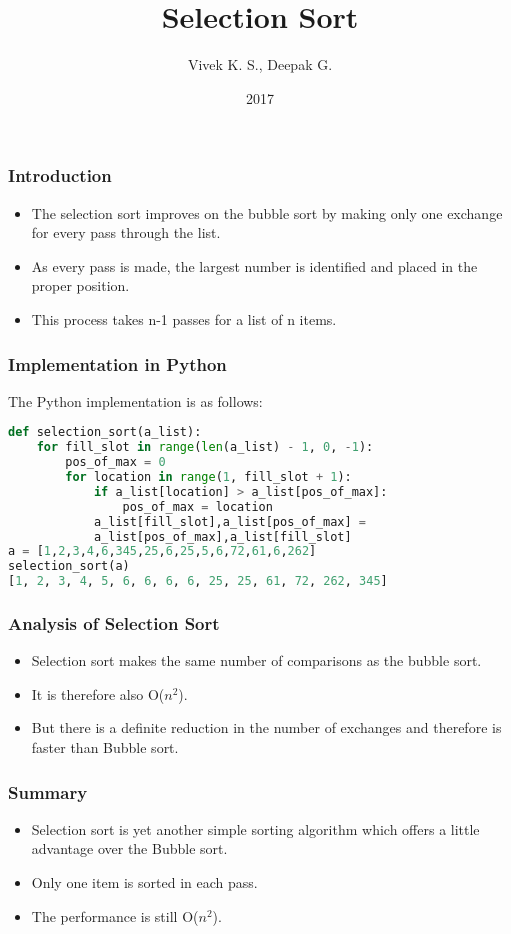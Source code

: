 \documentclass{beamer}
\title{Selection Sort}
\author{Vivek K. S., Deepak G.}
\institute{Information Systems Decision Sciences (ISDS)\\
MUMA College of Business\\
University of South Florida \\
Tampa, Florida}
\date{2017}
\begin{document}
\frame{\titlepage}
\begin{frame}
\frametitle{Introduction}
\begin{itemize}
\item The selection sort improves on the bubble sort by making only one exchange for every pass through the list.
\item As every pass is made, the largest number is identified and placed in the proper position.
\item This process takes n-1 passes for a list of n items.
\end{itemize}
\end{frame}


\begin{frame}[fragile]
\frametitle{Implementation in Python}
The Python implementation is as follows:
\begin{lstlisting}[language=Python]
def selection_sort(a_list):
    for fill_slot in range(len(a_list) - 1, 0, -1):
        pos_of_max = 0
        for location in range(1, fill_slot + 1):
            if a_list[location] > a_list[pos_of_max]:
                pos_of_max = location
            a_list[fill_slot],a_list[pos_of_max] = 
            a_list[pos_of_max],a_list[fill_slot]
a = [1,2,3,4,6,345,25,6,25,5,6,72,61,6,262]
selection_sort(a)
[1, 2, 3, 4, 5, 6, 6, 6, 6, 25, 25, 61, 72, 262, 345]
\end{lstlisting}
\end{frame}


\begin{frame}
\frametitle{Analysis of Selection Sort}
\begin{itemize}
\item Selection sort makes the same number of comparisons as the bubble sort.
\item It is therefore also O($n^2$).
\item But there is a definite reduction in the number of exchanges and therefore is faster than Bubble sort.
\end{itemize}
\end{frame}

\begin{frame}
\frametitle{Summary}
\begin{itemize}
\item Selection sort is yet another simple sorting algorithm which offers a little advantage over the Bubble sort.
\item Only one item is sorted in each pass.
\item The performance is still O($n^2$).
\end{itemize}
\end{frame}
\end{document}
